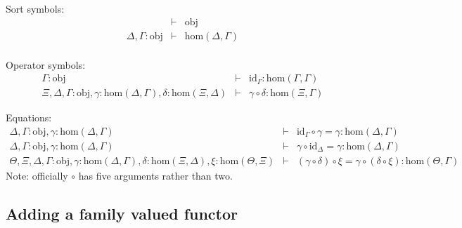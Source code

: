 \documentclass[11pt,a4paper]{article}
\theoremstyle{definition}
\newcommand{\id}{\mathsf{id}}
\def\Obj{\mathrm{obj}}
\def\Hom{\mathrm{hom}}
\def\id{\mathrm{id}}
\begin{document}
\begin{tiny}
Sort symbols:
\begin{eqnarray*}
&\vdash& \Obj\\
\Delta, \Gamma : \Obj &\vdash& \Hom(\Delta,\Gamma)\\
\end{eqnarray*}

Operator symbols:
\begin{eqnarray*}
\Gamma : \Obj &\vdash& \id_\Gamma : \Hom(\Gamma,\Gamma)\\
\Xi,\Delta,\Gamma : \Obj, \gamma : \Hom(\Delta,\Gamma), \delta : \Hom(\Xi,\Delta) &\vdash&
\gamma \circ \delta : \Hom(\Xi,\Gamma)
\end{eqnarray*}

Equations:
\begin{eqnarray*}
\Delta, \Gamma : \Obj, \gamma : \Hom(\Delta,\Gamma) &\vdash& \id_\Gamma \circ \gamma = \gamma : \Hom(\Delta,\Gamma)\\
\Delta, \Gamma : \Obj, \gamma : \Hom(\Delta,\Gamma) &\vdash& \gamma \circ \id_\Delta = \gamma : \Hom(\Delta,\Gamma)\\
\Theta, \Xi,\Delta,\Gamma : \Obj, \gamma : \Hom(\Delta,\Gamma), \delta : \Hom(\Xi,\Delta), \xi : \Hom(\Theta,\Xi) &\vdash&
(\gamma \circ \delta) \circ \xi = \gamma \circ (\delta \circ \xi): \Hom(\Theta,\Gamma)
\end{eqnarray*}
Note: officially $\circ$ has five arguments rather than two.
\end{tiny}

\subsection{Adding a family valued functor}
\end{document}
